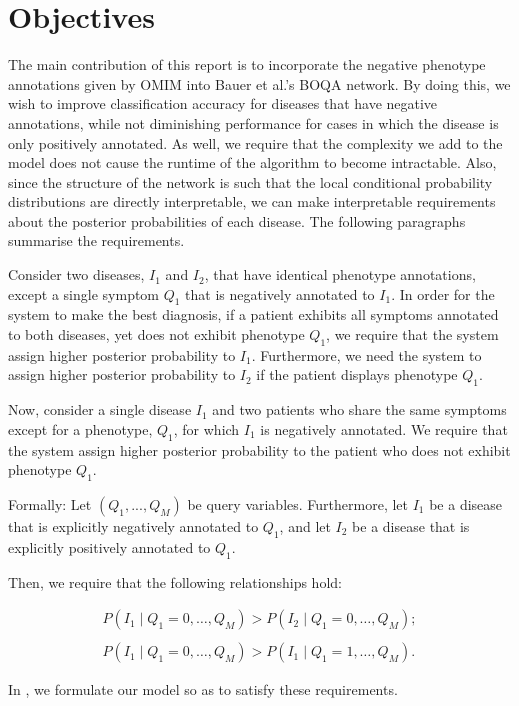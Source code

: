 \section{Objectives}
\label{sec:obj}

The main contribution of this report is to incorporate the negative phenotype
annotations given by OMIM \cite{hamosh2005online} into
Bauer et al.'s \cite{bauer2012bayesian} BOQA network.
By doing this, we wish to improve classification accuracy for diseases that
have negative annotations, while not diminishing performance for cases in which
the disease is only positively annotated.
As well, we require that the complexity we add to the model does not cause the
runtime of the algorithm to become intractable.
%
Also, since the structure of the network is such that the local conditional
probability distributions are directly interpretable, we can make interpretable
requirements about the posterior probabilities of each disease. 
The following paragraphs summarise the requirements.

Consider two diseases, $I_1$ and $I_2$, that have identical phenotype
annotations, except a single symptom $Q_1$ that is negatively annotated to $I_1$.
In order for the system to make the best diagnosis, if a patient exhibits all
symptoms annotated to both diseases, yet does not exhibit phenotype $Q_1$, we
require that the system assign higher posterior probability to $I_1$.
Furthermore, we need the system to assign higher posterior probability to $I_2$
if the patient displays phenotype $Q_1$.

Now, consider a single disease $I_1$ and two patients who share the same symptoms
except for a phenotype, $Q_1$, for which $I_1$ is negatively annotated. We require that
the system assign higher posterior probability to the patient who does not
exhibit phenotype $Q_1$.

Formally:
%
Let $(Q_1, ..., Q_M)$ be query variables.
Furthermore,
let $I_1$ be a disease that is explicitly negatively annotated to $Q_1$, and
let $I_2$ be a disease that is explicitly positively annotated to $Q_1$.

Then, we require that the following relationships hold:

\vspace{0.1cm}
\begin{align*}
    P(I_1 \mid Q_1 = 0, \hdots, Q_M) >
    P(I_2 \mid Q_1 = 0, \hdots, Q_M); \\\\
    P(I_1 \mid Q_1 = 0, \hdots, Q_M) >
    P(I_1 \mid Q_1 = 1, \hdots, Q_M).
\end{align*}
\vspace{0.1cm}

In , we formulate our model so as to satisfy these requirements.

